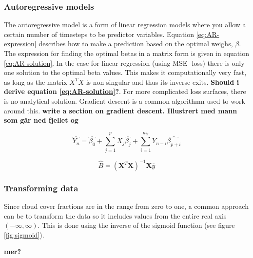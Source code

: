 \subsubsection{Autoregressive models} \label{sec:ARmodels}
The autoregressive model is a form of linear regression models where you allow a certain number of timesteps to be predictor variables. Equation \eqref{eq:AR-expression} describes how to make a prediction based on the optimal weighs, $\beta$. The expression for finding the optimal betas in a matrix form is given in equation \eqref{eq:AR-solution}. In the case for linear regression (using MSE- loss) there is only one solution to the optimal beta values. This makes it computationally very fast, as long as the matrix $X^TX$ is non-singular and thus its inverse exits. \textbf{Should i derive equation \eqref{eq:AR-solution}?}. For more complicated loss surfaces, there is no analytical solution. Gradient descent is a common algorithmn used to work around this. \textbf{write a section on gradient descent. Illustrert med mann som går ned fjellet og } 

\begin{equation} \label{eq:AR-expression}
    \hat{Y_n} = \hat{\beta_0} + \sum_{j=1}^p X_j\hat{\beta_j} + \sum_{i = 1}^{n_{ts}} Y_{n-i}\hat{\beta_{p+i}}
\end{equation}

\begin{equation} \label{eq:AR-solution}
    \hat{B} = \left( \textbf{X}^T\textbf{X} \right)^{-1}\textbf{X}\bar{y}
\end{equation}

\subsubsection{Transforming data} \label{sec:transforming_cloud_cover}
Since cloud cover fractions are in the range from zero to one, a common approach can be to transform the data so it includes values from the entire real axis $(-\infty, \infty)$. This is done using the inverse of the sigmoid function (see figure \ref{fig:sigmoid}).

\textbf{mer?}

